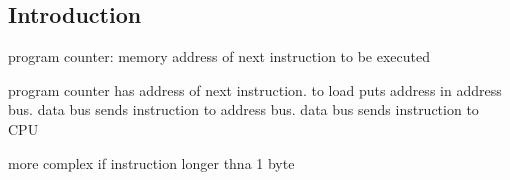 
\subsection{Introduction}

program counter: memory address of next instruction to be executed

program counter has address of next instruction. to load puts address in address bus. data bus sends instruction to address bus. data bus sends instruction to CPU

more complex if instruction longer thna 1 byte

